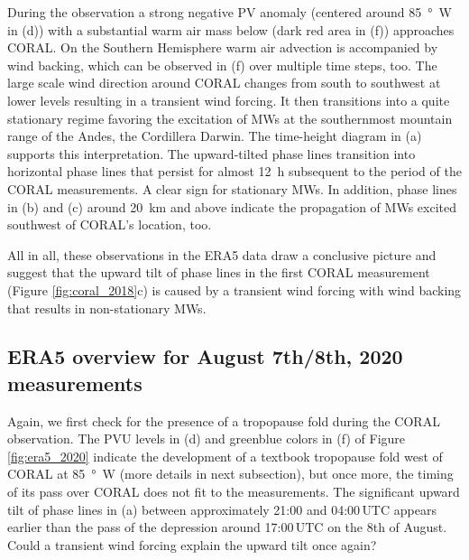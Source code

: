 During the observation a strong negative PV anomaly (centered around \SI{85}{\degree W} in (d)) with a substantial warm air mass below (dark red area in (f)) approaches CORAL. On the Southern Hemisphere warm air advection is accompanied by wind backing, which can be observed in (f) over multiple time steps, too. The large scale wind direction around CORAL changes from south to southwest at lower levels resulting in a transient wind forcing. It then transitions into a quite stationary regime favoring the excitation of MWs at the southernmost mountain range of the Andes, the Cordillera Darwin. The time-height diagram in (a) supports this interpretation. The upward-tilted phase lines transition into horizontal phase lines that persist for almost \SI{12}{h} subsequent to the period of the CORAL measurements. A clear sign for stationary MWs. In addition, phase lines in (b) and (c) around \SI{20}{\kilo\meter} and above indicate the propagation of MWs excited southwest of CORAL's location, too.

All in all, these observations in the ERA5 data draw a conclusive picture and suggest that the upward tilt of phase lines in the first CORAL measurement (Figure \ref{fig:coral_2018}c) is caused by a transient wind forcing with wind backing that results in non-stationary MWs. 
\subsection*{ERA5 overview for August 7th/8th, 2020 measurements}
Again, we first check for the presence of a tropopause fold during the CORAL observation. The PVU levels in (d) and greenblue colors in (f) of Figure \ref{fig:era5_2020} indicate the development of a textbook tropopause fold west of CORAL at \SI{85}{\degree W} (more details in next subsection), but once more, the timing of its pass over CORAL does not fit to the measurements. The significant upward tilt of phase lines in (a) between approximately 21:00 and 04:00$ \, \textrm{UTC}$ appears earlier than the pass of the depression around 17:00$ \, \textrm{UTC}$ on the 8th of August. Could a transient wind forcing explain the upward tilt once again?

